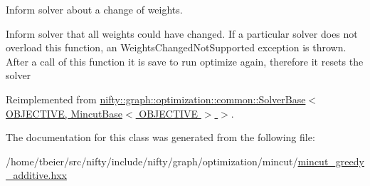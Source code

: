 Inform solver about a change of weights. 

Inform solver that all weights could have changed. If a particular solver does not overload this function, an Weights\+Changed\+Not\+Supported exception is thrown. After a call of this function it is save to run optimize again, therefore it resets the solver 

Reimplemented from \hyperlink{classnifty_1_1graph_1_1optimization_1_1common_1_1SolverBase_a8ab38d61068370e24cca475ef1b5d8b1}{nifty\+::graph\+::optimization\+::common\+::\+Solver\+Base$<$ O\+B\+J\+E\+C\+T\+I\+V\+E, Mincut\+Base$<$ O\+B\+J\+E\+C\+T\+I\+V\+E $>$ $>$}.



The documentation for this class was generated from the following file\+:\begin{DoxyCompactItemize}
\item 
/home/tbeier/src/nifty/include/nifty/graph/optimization/mincut/\hyperlink{mincut__greedy__additive_8hxx}{mincut\+\_\+greedy\+\_\+additive.\+hxx}\end{DoxyCompactItemize}
